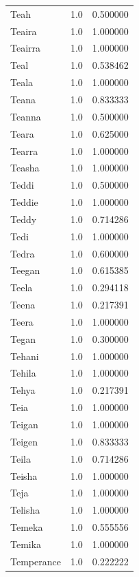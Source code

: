 \documentclass[
  letterpaper,
  DIV=11,
  numbers=noendperiod]{scrreprt}
\begin{document}
\begin{tabular}{lrr}
Teah            &   1.0 &   0.500000 \\
Teaira          &   1.0 &   1.000000 \\
Teairra         &   1.0 &   1.000000 \\
Teal            &   1.0 &   0.538462 \\
Teala           &   1.0 &   1.000000 \\
Teana           &   1.0 &   0.833333 \\
Teanna          &   1.0 &   0.500000 \\
Teara           &   1.0 &   0.625000 \\
Tearra          &   1.0 &   1.000000 \\
Teasha          &   1.0 &   1.000000 \\
Teddi           &   1.0 &   0.500000 \\
Teddie          &   1.0 &   1.000000 \\
Teddy           &   1.0 &   0.714286 \\
Tedi            &   1.0 &   1.000000 \\
Tedra           &   1.0 &   0.600000 \\
Teegan          &   1.0 &   0.615385 \\
Teela           &   1.0 &   0.294118 \\
Teena           &   1.0 &   0.217391 \\
Teera           &   1.0 &   1.000000 \\
Tegan           &   1.0 &   0.300000 \\
Tehani          &   1.0 &   1.000000 \\
Tehila          &   1.0 &   1.000000 \\
Tehya           &   1.0 &   0.217391 \\
Teia            &   1.0 &   1.000000 \\
Teigan          &   1.0 &   1.000000 \\
Teigen          &   1.0 &   0.833333 \\
Teila           &   1.0 &   0.714286 \\
Teisha          &   1.0 &   1.000000 \\
Teja            &   1.0 &   1.000000 \\
Telisha         &   1.0 &   1.000000 \\
Temeka          &   1.0 &   0.555556 \\
Temika          &   1.0 &   1.000000 \\
Temperance      &   1.0 &   0.222222 \\

\end{tabular}
\end{document}
